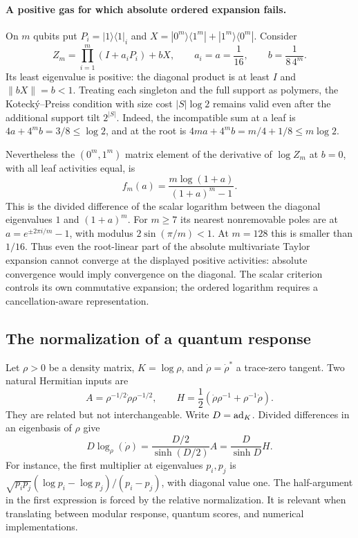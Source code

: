 \paragraph{A positive gas for which absolute ordered expansion fails.}
On $m$ qubits put $P_i=|1\rangle\langle1|_i$ and
$X=|0^m\rangle\langle1^m|+|1^m\rangle\langle0^m|$. Consider
\[
 Z_m=\prod_{i=1}^m(I+a_iP_i)+bX,
 \qquad a_i=a=\frac1{16},\qquad b=\frac1{8\,4^m}.
\]
Its least eigenvalue is positive: the diagonal product is at least $I$ and
$\|bX\|=b<1$. Treating each singleton and the full support as polymers,
the Koteck\'y--Preiss condition with size cost $|S|\log2$ remains valid even
after the additional support tilt $2^{|S|}$. Indeed, the incompatible sum at
a leaf is $4a+4^mb=3/8\le\log2$, and at the root is
$4ma+4^mb=m/4+1/8\le m\log2$.

Nevertheless the $(0^m,1^m)$ matrix element of the derivative of $\log Z_m$
at $b=0$, with all leaf activities equal, is
\begin{equation}
 f_m(a)=\frac{m\log(1+a)}{(1+a)^m-1}.
 \label{op:root-response}
\end{equation}
This is the divided difference of the scalar logarithm between the diagonal
eigenvalues $1$ and $(1+a)^m$. For $m\ge7$ its nearest nonremovable poles
are at $a=e^{\pm2\pi i/m}-1$, with modulus $2\sin(\pi/m)<1$.
At $m=128$ this is smaller than $1/16$. Thus even the root-linear part of
the absolute multivariate Taylor expansion cannot converge at the displayed
positive activities: absolute convergence would imply convergence on the
diagonal. The scalar criterion controls its own commutative expansion; the
ordered logarithm requires a cancellation-aware representation.

\subsection{The normalization of a quantum response}
\label{op:normalization}

Let $\rho>0$ be a density matrix, $K=\log\rho$, and
$\dot\rho=\dot\rho^*$ a trace-zero tangent. Two natural Hermitian inputs are
\[
 A=\rho^{-1/2}\dot\rho\rho^{-1/2},\qquad
 H=\frac12(\dot\rho\rho^{-1}+\rho^{-1}\dot\rho).
\]
They are related but not interchangeable. Write $D=\operatorname{ad}_K$. Divided
differences in an eigenbasis of $\rho$ give
\begin{equation}
 D\log_\rho(\dot\rho)
 =\frac{D/2}{\sinh(D/2)}A
 =\frac D{\sinh D}H.
 \label{op:log-response}
\end{equation}
For instance, the first multiplier at eigenvalues $p_i,p_j$ is
$\sqrt{p_ip_j}(\log p_i-\log p_j)/(p_i-p_j)$, with diagonal value one.
The half-argument in the first expression is forced by the relative
normalization. It is relevant when translating between modular response,
quantum scores, and numerical implementations.

